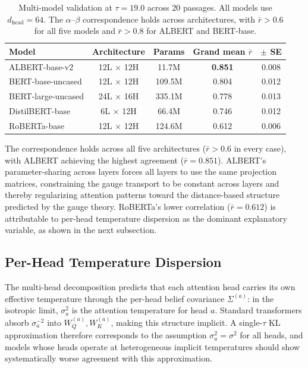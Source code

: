 \documentclass[twoside,11pt]{article}
\begin{document}
\begin{table}[h]
\centering
\renewcommand{\arraystretch}{1.15}
\begin{tabular}{lcccc}
\hline
\textbf{Model} & \textbf{Architecture} & \textbf{Params} & Grand mean $\bar{r}$ & $\pm$ SE \\
\hline
ALBERT-base-v2       & 12L $\times$ 12H & 11.7M  & \textbf{0.851} & 0.008 \\
BERT-base-uncased    & 12L $\times$ 12H & 109.5M & 0.804 & 0.012 \\
BERT-large-uncased   & 24L $\times$ 16H & 335.1M & 0.778 & 0.013 \\
DistilBERT-base      & 6L $\times$ 12H  & 66.4M  & 0.746 & 0.012 \\
RoBERTa-base         & 12L $\times$ 12H & 124.6M & 0.612 & 0.006 \\
\hline
\end{tabular}
\caption{Multi-model validation at $\tau = 19.0$ across 20 passages. All models use $d_{\text{head}} = 64$. The $\alpha$--$\beta$ correspondence holds across architectures, with $\bar{r} > 0.6$ for all five models and $\bar{r} > 0.8$ for ALBERT and BERT-base.}
\label{tab:multi_model_supp}
\end{table}

The correspondence holds across all five architectures ($\bar{r} > 0.6$ in every case), with ALBERT achieving the highest agreement ($\bar{r} = 0.851$). ALBERT's parameter-sharing across layers forces all layers to use the same projection matrices, constraining the gauge transport to be constant across layers and thereby regularizing attention patterns toward the distance-based structure predicted by the gauge theory. RoBERTa's lower correlation ($\bar{r} = 0.612$) is attributable to per-head temperature dispersion as the dominant explanatory variable, as shown in the next subsection.

\subsection{Per-Head Temperature Dispersion}

The multi-head decomposition predicts that each attention head carries its own effective temperature through the per-head belief covariance $\Sigma^{(a)}$: in the isotropic limit, $\sigma_a^2$ is the attention temperature for head $a$. Standard transformers absorb $\sigma_a^{-2}$ into $W_Q^{(a)}, W_K^{(a)}$, making this structure implicit. A single-$\tau$ KL approximation therefore corresponds to the assumption $\sigma_a^2 = \sigma^2$ for all heads, and models whose heads operate at heterogeneous implicit temperatures should show systematically worse agreement with this approximation.
\end{document}
